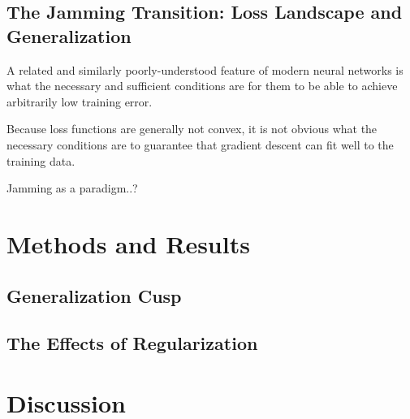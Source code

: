 \documentclass[a4paper, 12pt]{article}
\begin{document}
\subsection{The Jamming Transition: Loss Landscape and Generalization}

A related and similarly poorly-understood feature of modern neural networks is what the necessary and sufficient conditions are for them to be able to achieve arbitrarily low training error. 

Because loss functions are generally not convex, it is not obvious what the necessary conditions are to guarantee that gradient descent can fit well to the training data. 


Jamming as a paradigm..?

\section{Methods and Results}

\subsection{Generalization Cusp}
\subsection{The Effects of Regularization}

\section{Discussion}

\printbibliography
\end{document}
